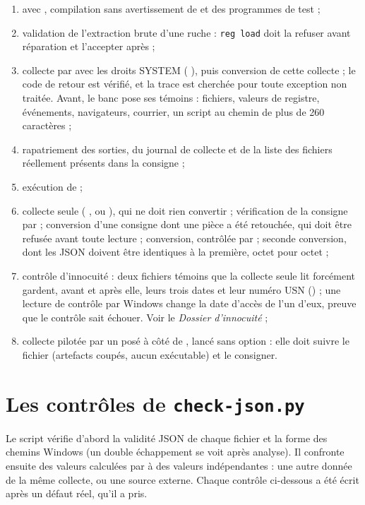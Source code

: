 \documentclass[11pt,a4paper,oneside]{report}
\begin{document}
\begin{enumerate}
  \item avec , compilation sans avertissement de \wac{} et des
    programmes de test ;
  \item validation de l'extraction brute d'une ruche : \texttt{reg load} doit la
    refuser avant réparation et l'accepter après ;
  \item collecte par \wac{} avec les droits SYSTEM ( 
    ), puis conversion de cette collecte ; le code de retour est
    vérifié, et la trace est cherchée pour toute exception non traitée. Avant,
    le banc pose ses témoins : fichiers, valeurs de registre, événements,
    navigateurs, courrier, un script au chemin de plus de 260 caractères ;
  \item rapatriement des sorties, du journal de collecte et de la liste des
    fichiers réellement présents dans la consigne ;
  \item exécution de  ;
  \item collecte seule (  , ou
    ), qui ne doit rien convertir ; vérification de la consigne
    par  ; conversion d'une consigne dont une pièce
    a été retouchée, qui doit être refusée avant toute lecture ; conversion,
    contrôlée par  ; seconde conversion, dont les JSON
    doivent être identiques à la première, octet pour octet ;
  \item contrôle d'innocuité : deux fichiers témoins que la collecte seule
    lit forcément gardent, avant et après elle, leurs trois dates et leur
    numéro USN () ; une lecture de contrôle par
    Windows change la date d'accès de l'un d'eux, preuve que le contrôle sait
    échouer. Voir le \emph{Dossier d'innocuité} ;
  \item collecte pilotée par un  posé à côté de \wac{},
    lancé sans option : elle doit suivre le fichier (artefacts coupés, aucun
    exécutable) et le consigner.
\end{enumerate}

\section{Les contrôles de \texttt{check-json.py}}

Le script vérifie d'abord la validité JSON de chaque fichier et la forme des
chemins Windows (un double échappement se voit après analyse). Il confronte
ensuite des valeurs calculées par \wac{} à des valeurs indépendantes : une
autre donnée de la même collecte, ou une source externe. Chaque contrôle
ci-dessous a été écrit après un défaut réel, qu'il a pris.
\end{document}
